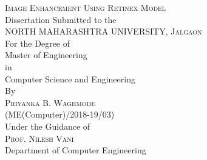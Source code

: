 \begin{titlepage}

\newcommand{\HRule}{\rule{\linewidth}{0.5mm}} %

\center %


\textsc{\normalsize Image Enhancement Using Retinex Model}\\[1.5cm] %
\normalsize Dissertation Submitted to the\\[0.5cm] %
\textsc{\normalsize NORTH MAHARASHTRA UNIVERSITY, Jalgaon}\\[0.5cm] %
\normalsize For the Degree of\\[0.25cm]
\normalsize Master of Engineering\\[0.5cm]
\normalsize in\\[0.5cm]
\normalsize Computer Science and Engineering\\[0.5cm]
\normalsize By\\[0.5cm]
\textsc{\normalsize Priyanka B. Waghmode}\\[0.25cm]
\normalsize (ME(Computer)/2018-19/03)\\[0.5cm]
\normalsize Under the Guidance of\\
\textsc{\normalsize Prof. Nilesh Vani }\\
\normalsize Department of Computer Engineering






\end{titlepage}

